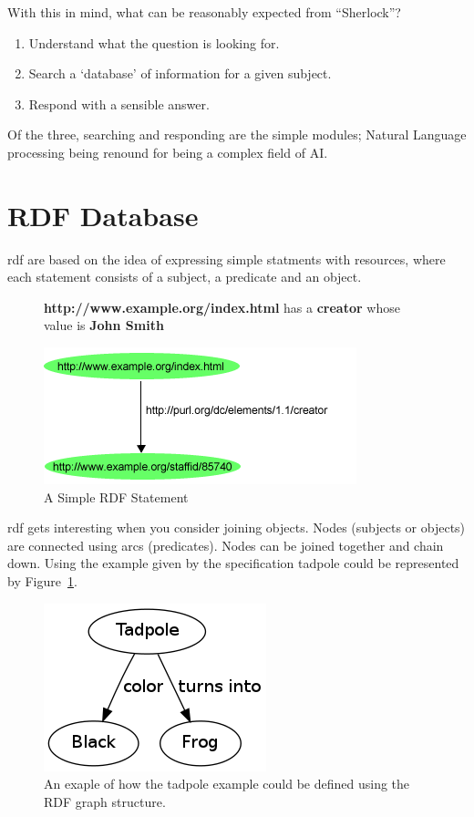 \documentclass[11pt,a4paper]{report}
\begin{document}
With this in mind, what can be reasonably expected from ``Sherlock''?

\begin{enumerate}
\item Understand what the question is looking for.
\item Search a `database' of information for a given subject.
\item Respond with a sensible answer.
\end{enumerate}

Of the three, searching and responding are the simple modules; Natural 
Language processing being renound for being a complex field of AI.


\section{RDF Database}
\gls{rdf} are based on the idea of expressing simple statments with resources,
where each statement consists of a subject, a predicate and an object.

\begin{figure}[h!]
\textbf{http://www.example.org/index.html} has a \textbf{creator} whose value 
is \textbf{John Smith}

\centering
\includegraphics[scale=0.5]{img/fig2dec16.png}
\caption{A Simple RDF Statement\cite{website:w3_rdf_primer}}
\end{figure}

\gls{rdf} gets interesting when you consider joining objects. Nodes (subjects or 
objects) are connected using arcs (predicates). Nodes can be joined together
and chain down. Using the example given by the specification tadpole could be
represented by Figure~\ref{fig:tadpole}.

\begin{figure}[h!]
\centering
\includegraphics[scale=0.5]{img/tadpole.png}
\caption{An exaple of how the tadpole\label{fig:tadpole} example could be 
defined using the RDF graph structure.}
\end{figure}
\end{document}
